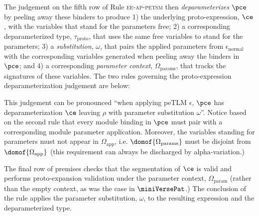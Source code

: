 \documentclass[acmsmall,10pt,review,anonymous]{acmart}\settopmatter{printfolios=true}
\begin{document}
The judgement on the fifth row of Rule \textsc{ee-ap-petsm} then \emph{deparameterizes} $\pce$ by peeling away these binders to produce 1) the underlying proto-expression, $\ce$, with the variables that stand for the parameters free; 2) a corresponding deparameterized type, $\tau_\text{proto}$, that uses the same free variables to stand for the parameters; 3) a \emph{substitution}, $\omega$, that pairs the applied parameters from $\epsilon_\text{normal}$ with the corresponding variables generated when peeling away the binders in $\pce$; and 4) a corresponding \emph{parameter context}, $\Omega_\text{params}$, that tracks the signatures of these variables. The two rules governing the proto-expression deparameterization judgement are below:
\begin{mathpar}

\end{mathpar}
This judgement can be pronounced ``when applying peTLM $\epsilon$, $\pce$ has deparameterization $\ce$ leaving $\rho$ with parameter substitution $\omega$''. 
Notice based on the second rule that every module binding in $\pce$ must pair with a corresponding module parameter application. Moreover, the variables standing for parameters must not appear in $\Omega_\text{app}$, i.e. $\domof{\Omega_\text{params}}$ must be disjoint from $\domof{\Omega_\text{app}}$ (this requirement can always be discharged by alpha-variation.)

The final row of premises checks that the segmentation of $\ce$ is valid and  performs proto-expansion validation under the parameter context, $\Omega_\text{param}$ (rather than the empty context, as was the case in $\miniVersePat$.) The conclusion of the rule applies the parameter substitution, $\omega$, to the resulting expression and the deparameterized type.
\end{document}

